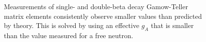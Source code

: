 \documentclass[/main.tex]{subfiles}
\begin{document}
\begin{figure}[t]
  \centering
  \caption[$g_A$ Quenching in single- and double-beta decay]{\label{fig:quenching}
    Measurements of single- and double-beta decay Gamow-Teller matrix elements consistently observe smaller values than predicted by theory. This is solved by using an effective $g_A$ that is smaller than the value measured for a free neutron.
  }
\end{figure}
\end{document}

